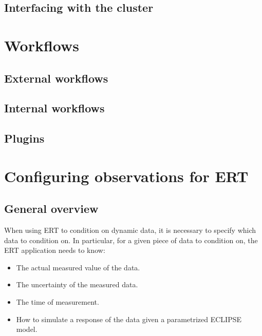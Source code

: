 \documentclass[letterpaper,10pt,english]{sphinxmanual}
\begin{document}
\section{Interfacing with the cluster}
\label{\detokenize{forward_model/index:interfacing-with-the-cluster}}

\chapter{Workflows}
\label{\detokenize{workflows/index::doc}}\label{\detokenize{workflows/index:workflows}}

\section{External workflows}
\label{\detokenize{workflows/index:external-workflows}}

\section{Internal workflows}
\label{\detokenize{workflows/index:internal-workflows}}

\section{Plugins}
\label{\detokenize{workflows/index:plugins}}

\chapter{Configuring observations for ERT}
\label{\detokenize{observations/index:configuring-observations-for-ert}}\label{\detokenize{observations/index::doc}}

\section{General overview}
\label{\detokenize{observations/index:general-overview}}
When using ERT to condition on dynamic data, it is necessary to
specify which data to condition on. In particular, for a given piece
of data to condition on, the ERT  application needs to know:
\begin{itemize}
\item {} 
The actual measured value of the data.

\item {} 
The uncertainty of the measured data.

\item {} 
The time of measurement.

\item {} 
How to simulate a response of the data given a parametrized ECLIPSE model.

\end{itemize}
\end{document}
